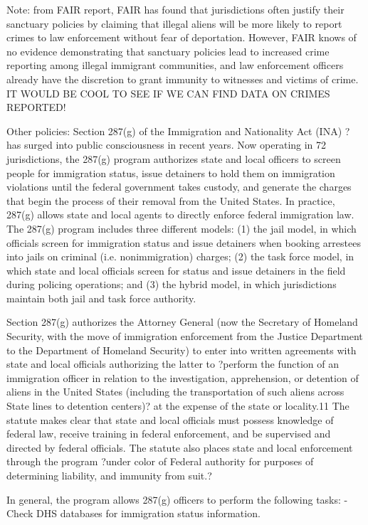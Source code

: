 Note: from FAIR report, FAIR has found that jurisdictions often justify their sanctuary policies by claiming that illegal aliens will be more likely to report crimes to law enforcement without fear of deportation. However, FAIR knows of no evidence demonstrating that sanctuary policies lead to increased crime reporting among illegal immigrant communities, and law enforcement officers already have the discretion to grant immunity to witnesses and victims of crime. IT WOULD BE COOL TO SEE IF WE CAN FIND DATA ON CRIMES REPORTED!

Other policies:
Section 287(g) of the Immigration and Nationality Act (INA) ? has surged into public consciousness in recent years. Now operating in 72 jurisdictions, the 287(g) program authorizes state and local officers to screen people for immigration status, issue detainers to hold them on immigration violations until the federal government takes custody, and generate the charges that begin the process of their removal from the United States. In practice, 287(g) allows state and local agents to directly enforce federal immigration law. The 287(g) program includes three different models: (1) the jail model, in which officials screen
for immigration status and issue detainers when booking arrestees into jails on criminal (i.e. nonimmigration) charges; (2) the task force model, in which state and local officials screen for status and issue detainers in the field during policing operations; and (3) the hybrid model, in which jurisdictions maintain both jail and task force authority.

Section 287(g) authorizes the Attorney General (now the Secretary of Homeland Security, with the move of immigration enforcement from the Justice Department to the Department of Homeland Security)
to enter into written agreements with state and local officials authorizing the latter to ?perform the function of an immigration officer in relation to the investigation, apprehension, or detention of aliens in the United States (including the transportation of such aliens across State lines to detention centers)? at the expense of the state or locality.11 The statute makes clear that state and local officials must possess knowledge of federal law, receive training in federal enforcement, and be supervised and directed by federal officials. The statute also places state and local enforcement through the program ?under color of Federal authority for purposes of determining liability, and immunity from suit.?


In general, the program allows 287(g) officers to perform the following tasks:
- Check DHS databases for immigration status information.


